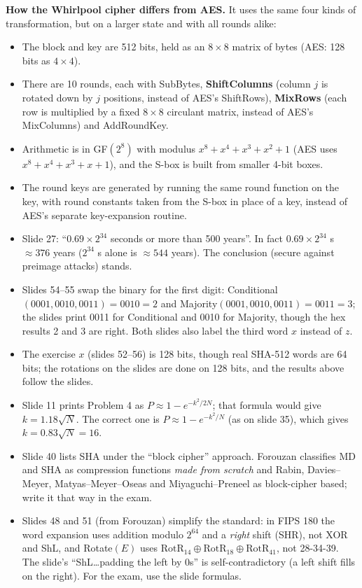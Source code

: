 \textbf{How the Whirlpool cipher differs from AES.} It uses the same four kinds of transformation, but on a larger state and with all rounds alike:
\begin{itemize}[nosep]
  \item The block and key are 512 bits, held as an $8 \times 8$ matrix of bytes (AES: 128 bits as $4 \times 4$).
  \item There are 10 rounds, each with SubBytes, \textbf{ShiftColumns} (column $j$ is rotated down by $j$ positions, instead of AES's ShiftRows), \textbf{MixRows} (each row is multiplied by a fixed $8 \times 8$ circulant matrix, instead of AES's MixColumns) and AddRoundKey.
  \item Arithmetic is in GF$(2^8)$ with modulus $x^8 + x^4 + x^3 + x^2 + 1$ (AES uses $x^8 + x^4 + x^3 + x + 1$), and the S-box is built from smaller 4-bit boxes.
  \item The round keys are generated by running the same round function on the key, with round constants taken from the S-box in place of a key, instead of AES's separate key-expansion routine.
\end{itemize}

\begin{fixbox}
\begin{itemize}[nosep]
  \item Slide 27: ``$0.69 \times 2^{34}$ seconds or more than 500 years''. In fact $0.69 \times 2^{34}$ s $\approx 376$ years ($2^{34}$ s alone is $\approx 544$ years). The conclusion (secure against preimage attacks) stands.
  \item Slides 54--55 swap the binary for the first digit: Conditional$(0001, 0010, 0011) = 0010 = 2$ and Majority$(0001, 0010, 0011) = 0011 = 3$; the slides print 0011 for Conditional and 0010 for Majority, though the hex results 2 and 3 are right. Both slides also label the third word $x$ instead of $z$.
  \item The exercise $x$ (slides 52--56) is 128 bits, though real SHA-512 words are 64 bits; the rotations on the slides are done on 128 bits, and the results above follow the slides.
  \item Slide 11 prints Problem 4 as $P \approx 1 - e^{-k^2/2N}$; that formula would give $k = 1.18\sqrt N$. The correct one is $P \approx 1 - e^{-k^2/N}$ (as on slide 35), which gives $k = 0.83\sqrt N = 16$.
  \item Slide 40 lists SHA under the ``block cipher'' approach. Forouzan classifies MD and SHA as compression functions \emph{made from scratch} and Rabin, Davies--Meyer, Matyas--Meyer--Oseas and Miyaguchi--Preneel as block-cipher based; write it that way in the exam.
  \item Slides 48 and 51 (from Forouzan) simplify the standard: in FIPS 180 the word expansion uses addition modulo $2^{64}$ and a \emph{right} shift (SHR), not XOR and ShL, and Rotate$(E)$ uses $\mathrm{RotR}_{14} \oplus \mathrm{RotR}_{18} \oplus \mathrm{RotR}_{41}$, not 28-34-39. The slide's ``ShL\dots padding the left by 0s'' is self-contradictory (a left shift fills on the right). For the exam, use the slide formulas.
\end{itemize}
\end{fixbox}
